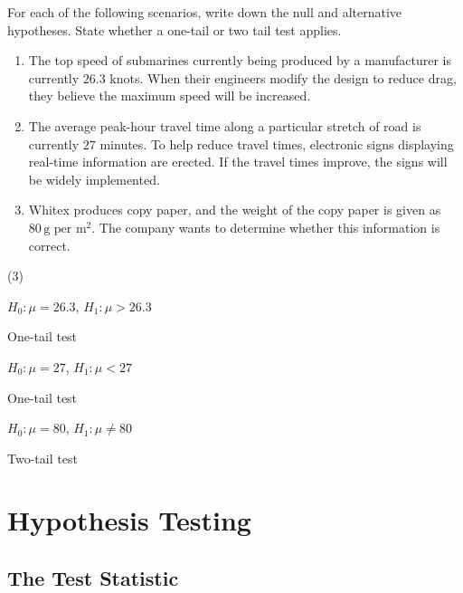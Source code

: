 \documentclass[11pt,a4paper]{book}
\begin{document}
\begin{example}

For each of the following scenarios, write down the null and alternative
hypotheses. State whether a one-tail or two tail test applies.

\begin{enumerate}[label=(\alph*)]

\item  The top speed of submarines currently being produced by a
manufacturer is currently $26.3$ knots. When their engineers modify
the design to reduce drag, they believe the maximum speed will be
increased.

\item  The average peak-hour travel time along a particular stretch
of road is currently $27$ minutes. To help reduce travel times, electronic
signs displaying real-time information are erected. If the travel
times improve, the signs will be widely implemented. 

\item  Whitex produces copy paper, and the weight of the copy paper
is given as $80\,\text{g per m}^{2}$. The company wants to determine
whether this information is correct.

\end{enumerate}

\Solution

\begin{tasks}[label=(\alph*),label-width=3.5ex](3)

\task  $H_{0}:\mu=26.3$, $H_{1}:\mu>26.3$

One-tail test

\task  $H_{0}:\mu=27$, $H_{1}:\mu<27$

One-tail test

\task  $H_{0}:\mu=80$, $H_{1}:\mu\neq80$

Two-tail test

\end{tasks}

\end{example}

\section{Hypothesis Testing}

\subsection{The Test Statistic}
\end{document}

